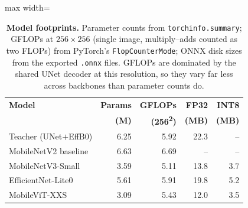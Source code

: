 \begin{table}[ht]
\centering
\caption{\textbf{Model footprints.} Parameter counts from \texttt{torchinfo.summary}; GFLOPs at $256{\times}256$ (single image, multiply--adds counted as two FLOPs) from PyTorch's \texttt{FlopCounterMode}; ONNX disk sizes from the exported \texttt{.onnx} files. GFLOPs are dominated by the shared UNet decoder at this resolution, so they vary far less across backbones than parameter counts do.}
\label{tab:t1-footprints}
\footnotesize
\setlength{\tabcolsep}{4pt}
\begin{adjustbox}{max width=\textwidth}
\begin{tabular}{@{}lrrrr@{}}
\toprule
\textbf{Model} & \textbf{Params} & \textbf{GFLOPs} & \textbf{FP32} & \textbf{INT8} \\
               & \textbf{(M)}    & \textbf{(256\textsuperscript{2})} & \textbf{(MB)} & \textbf{(MB)} \\
\midrule
Teacher (UNet$+$EffB0)  & 6.25 & 5.92 & 22.3 & --  \\
MobileNetV2 baseline    & 6.63 & 6.69 & --  & --  \\
MobileNetV3-Small       & 3.59 & 5.11 & 13.8 & 3.7  \\
EfficientNet-Lite0      & 5.61 & 5.91 & 19.8 & 5.2  \\
MobileViT-XXS           & 3.09 & 5.43 & 12.0 & 3.5  \\
\bottomrule
\end{tabular}
\end{adjustbox}
\end{table}
